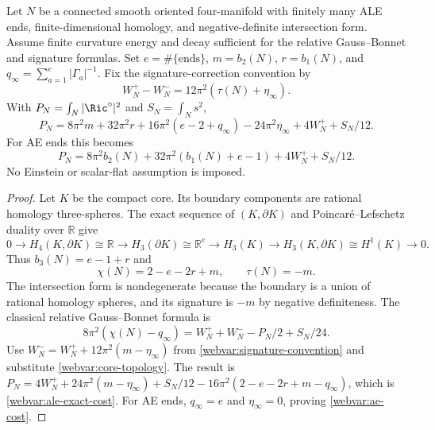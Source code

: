 \begin{lemma}
\label{webvar:ale-cost}
Let $N$ be a connected smooth oriented four-manifold with finitely
many ALE ends, finite-dimensional homology, and negative-definite
intersection form.  Assume finite curvature energy and decay
sufficient for the relative Gauss--Bonnet and signature formulas.
Set $e=\#\{\text{ends}\}$, $m=b_2(N)$, $r=b_1(N)$, and
$q_\infty=\sum_{a=1}^e|\Gamma_a|^{-1}$.
Fix the signature-correction convention by
\begin{equation}\label{webvar:signature-convention}
 W_N^+-W_N^-=12\pi^2(\tau(N)+\eta_\infty).
\end{equation}
With $P_N=\int_N|\Ric^\circ|^2$ and $S_N=\int_Ns^2$,
\begin{equation}\label{webvar:ale-exact-cost}
 P_N=8\pi^2m+32\pi^2r+16\pi^2(e-2+q_\infty)
           -24\pi^2\eta_\infty+4W_N^++S_N/12.
\end{equation}
For AE ends this becomes
\begin{equation}\label{webvar:ae-cost}
 P_N=8\pi^2b_2(N)+32\pi^2(b_1(N)+e-1)+4W_N^++S_N/12.
\end{equation}
No Einstein or scalar-flat assumption is imposed.
\end{lemma}
\begin{proof}
Let $K$ be the compact core.  Its boundary components are rational
homology three-spheres.  The exact sequence of $(K,\partial K)$
and Poincar\'e--Lefschetz duality over $\mathbb R$ give
\[
 0\longrightarrow H_4(K,\partial K)\cong\mathbb R
 \longrightarrow H_3(\partial K)\cong\mathbb R^e
 \longrightarrow H_3(K)
 \longrightarrow H_3(K,\partial K)\cong H^1(K)
 \longrightarrow0.
\]
Thus $b_3(N)=e-1+r$ and
\begin{equation}\label{webvar:core-topology}
 \chi(N)=2-e-2r+m,\qquad \tau(N)=-m.
\end{equation}
The intersection form is nondegenerate because the boundary is a
union of rational homology spheres, and its signature is $-m$ by
negative definiteness.  The classical relative Gauss--Bonnet formula is
\begin{equation}\label{webvar:relative-gb}
 8\pi^2(\chi(N)-q_\infty)
       =W_N^++W_N^--P_N/2+S_N/24.
\end{equation}
Use $W_N^-=W_N^++12\pi^2(m-\eta_\infty)$ from
\eqref{webvar:signature-convention} and substitute
\eqref{webvar:core-topology}.  The result is
$P_N=4W_N^++24\pi^2(m-\eta_\infty)+S_N/12
 -16\pi^2(2-e-2r+m-q_\infty)$, which is
\eqref{webvar:ale-exact-cost}.  For AE ends,
$q_\infty=e$ and $\eta_\infty=0$, proving \eqref{webvar:ae-cost}.
\end{proof}

